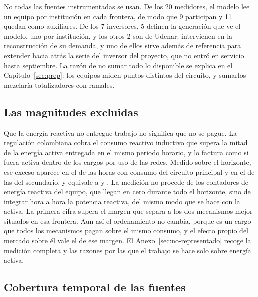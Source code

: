 \begin{guardado}
\begin{detallebox}
No todas las fuentes instrumentadas se usan. De los 20 medidores, el
modelo lee un equipo por institución en cada frontera, de modo que 9
participan y 11 quedan como auxiliares. De los 7 inversores, 5
definen la generación que ve el modelo, uno por institución, y los otros 2
son de Udenar: intervienen en la reconstrucción de su demanda, y uno de
ellos sirve además de referencia para extender hacia atrás la serie del
inversor del proyecto, que no entró en servicio hasta septiembre. La razón de no sumar todo lo
disponible se explica en el Capítulo~\ref{sec:prep}: los equipos miden
puntos distintos del circuito, y sumarlos mezclaría totalizadores con
ramales.
\end{detallebox}

\subsection{Las magnitudes excluidas}
\label{sub:dato-reactiva}

Que la energía reactiva no entregue trabajo no significa que no se pague.
La regulación colombiana cobra el consumo reactivo inductivo que supera la
mitad de la energía activa entregada en el mismo periodo horario, y lo
factura como si fuera activa dentro de los cargos por uso de las redes.
Medido sobre el horizonte, ese exceso aparece en el  de las
horas con consumo del circuito principal y en el  de las del
secundario, y equivale a  y . La
medición no procede de los contadores de energía reactiva del equipo, que
llegan en cero durante todo el horizonte, sino de integrar hora a hora la
potencia reactiva, del mismo modo que se hace con la activa. La
primera cifra supera el margen que separa a los dos mecanismos mejor
situados en esa frontera. Aun así el ordenamiento no cambia, porque es un
cargo que todos los mecanismos pagan sobre el mismo consumo, y el efecto
propio del mercado sobre él vale el  de ese margen. El
Anexo~\ref{sec:no-representado} recoge la medición completa y las razones
por las que el trabajo se hace solo sobre energía activa.
\end{guardado}

\subsection{Cobertura temporal de las fuentes}
\label{sub:dato-gantt}

